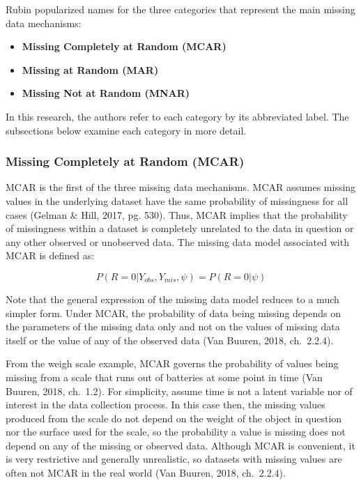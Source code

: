 \documentclass[12pt,oneside]{chicagocapstone}
\providecommand{\tightlist}{%
  \setlength{\itemsep}{0pt}\setlength{\parskip}{0pt}}
\begin{document}
Rubin popularized names for the three categories that represent the main
missing data mechanisms:
\begin{itemize}
\tightlist
\item
  \textbf{Missing Completely at Random (MCAR)}
\item
  \textbf{Missing at Random (MAR)}
\item
  \textbf{Missing Not at Random (MNAR)}
\end{itemize}
In this research, the authors refer to each category by its abbreviated
label. The subsections below examine each category in more detail.

\subsubsection*{Missing Completely at Random (MCAR)}\label{mcar}

MCAR is the first of the three missing data mechanisms. MCAR assumes
missing values in the underlying dataset have the same probability of
missingness for all cases (Gelman \& Hill, 2017, pg. 530). Thus, MCAR
implies that the probability of missingness within a dataset is
completely unrelated to the data in question or any other observed or
unobserved data. The missing data model associated with MCAR is defined
as:

\[P(R=0|Y_{obs},Y_{mis},\psi) = P(R=0|\psi)\]

Note that the general expression of the missing data model reduces to a
much simpler form. Under MCAR, the probability of data being missing
depends on the parameters of the missing data only and not on the values
of missing data itself or the value of any of the observed data (Van
Buuren, 2018, ch.~2.2.4).

From the weigh scale example, MCAR governs the probability of values
being missing from a scale that runs out of batteries at some point in
time (Van Buuren, 2018, ch.~1.2). For simplicity, assume time is not a
latent variable nor of interest in the data collection process. In this
case then, the missing values produced from the scale do not depend on
the weight of the object in question nor the surface used for the scale,
so the probability a value is missing does not depend on any of the
missing or observed data. Although MCAR is convenient, it is very
restrictive and generally unrealistic, so datasets with missing values
are often not MCAR in the real world (Van Buuren, 2018, ch.~2.2.4).
\end{document}

